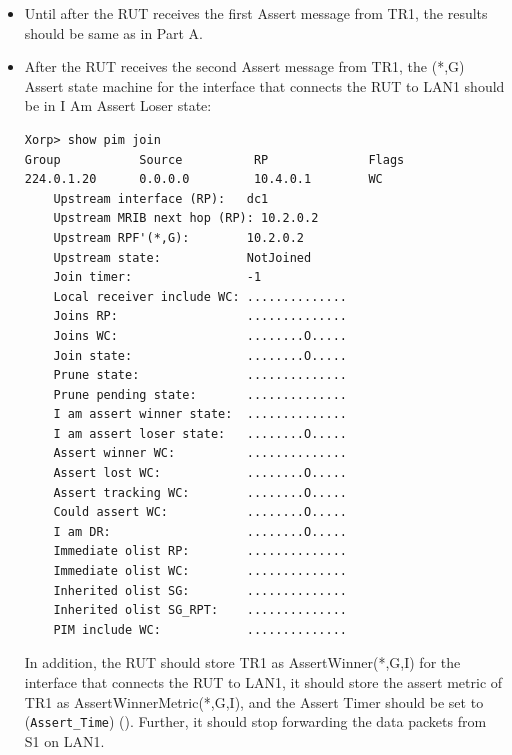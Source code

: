 \documentclass[11pt]{report}
\begin{document}
\begin{itemize}

  \item Until after the RUT receives the first Assert message from TR1, the
  results should be same as in Part A.

  \item After the RUT receives the second Assert message from TR1, the (*,G)
  Assert state machine for the interface that connects the RUT to LAN1 should
  be in I Am Assert Loser state:

\begin{verbatim}
Xorp> show pim join 
Group           Source          RP              Flags
224.0.1.20      0.0.0.0         10.4.0.1        WC   
    Upstream interface (RP):   dc1
    Upstream MRIB next hop (RP): 10.2.0.2
    Upstream RPF'(*,G):        10.2.0.2
    Upstream state:            NotJoined 
    Join timer:                -1
    Local receiver include WC: ..............
    Joins RP:                  ..............
    Joins WC:                  ........O.....
    Join state:                ........O.....
    Prune state:               ..............
    Prune pending state:       ..............
    I am assert winner state:  ..............
    I am assert loser state:   ........O.....
    Assert winner WC:          ..............
    Assert lost WC:            ........O.....
    Assert tracking WC:        ........O.....
    Could assert WC:           ........O.....
    I am DR:                   ........O.....
    Immediate olist RP:        ..............
    Immediate olist WC:        ..............
    Inherited olist SG:        ..............
    Inherited olist SG_RPT:    ..............
    PIM include WC:            ..............
\end{verbatim}

  In addition, the RUT should store TR1 as AssertWinner(*,G,I) for the
  interface that connects the RUT to LAN1, it should store the assert metric
  of TR1 as AssertWinnerMetric(*,G,I), and the Assert Timer should be set to
  (\verb=Assert_Time=) ({\PimsmAssertTime}).
  Further, it should stop forwarding the data packets from S1 on LAN1.

\end{itemize}

\end{document}
